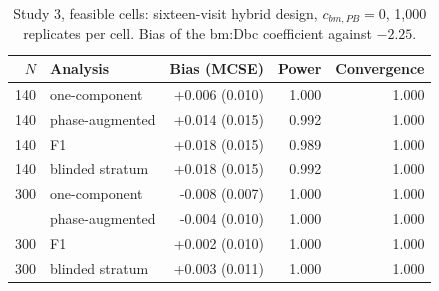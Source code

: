 \documentclass[
  11pt,
]{article}
\begin{document}
\begin{table}

\caption{\label{tab:study3}Study 3, feasible cells: sixteen-visit hybrid design, $c_{bm,PB} = 0$, 1,000 replicates per cell. Bias of the bm:Dbc coefficient against $-2.25$.}
\centering
\begin{tabular}[t]{rlrrr}
\toprule
$N$ & Analysis & Bias (MCSE) & Power & Convergence\\
\midrule
140 & one-component & +0.006 (0.010) & 1.000 & 1.000\\
140 & phase-augmented & +0.014 (0.015) & 0.992 & 1.000\\
140 & F1 & +0.018 (0.015) & 0.989 & 1.000\\
140 & blinded stratum & +0.018 (0.015) & 0.992 & 1.000\\
300 & one-component & -0.008 (0.007) & 1.000 & 1.000\\
\addlinespace
300 & phase-augmented & -0.004 (0.010) & 1.000 & 1.000\\
300 & F1 & +0.002 (0.010) & 1.000 & 1.000\\
300 & blinded stratum & +0.003 (0.011) & 1.000 & 1.000\\
\bottomrule
\end{tabular}
\end{table}
\end{document}
